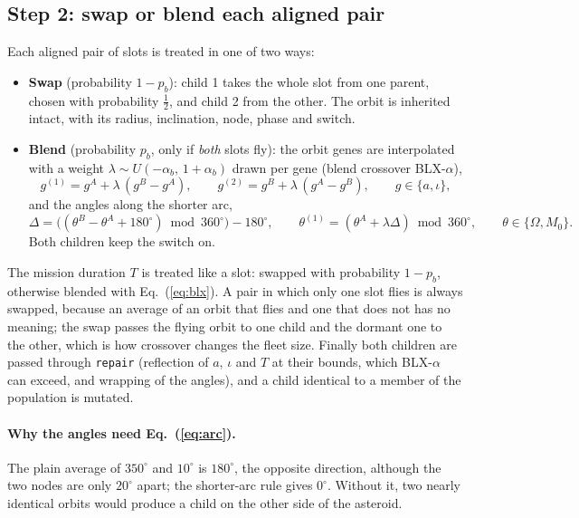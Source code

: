 \subsection{Step 2: swap or blend each aligned pair}
Each aligned pair of slots is treated in one of two ways:
\begin{itemize}
  \item \textbf{Swap} (probability $1-p_b$): child 1 takes the whole slot from one parent, chosen
        with probability $\tfrac12$, and child 2 from the other. The orbit is inherited intact,
        with its radius, inclination, node, phase and switch.
  \item \textbf{Blend} (probability $p_b$, only if \emph{both} slots fly): the orbit genes are
        interpolated with a weight $\lambda\sim U(-\alpha_b,\,1+\alpha_b)$ drawn per gene
        (blend crossover BLX-$\alpha$),
        \begin{equation}
        g^{(1)}=g^A+\lambda\,(g^B-g^A),\qquad g^{(2)}=g^B+\lambda\,(g^A-g^B),
        \qquad g\in\{a,\iota\},
        \label{eq:blx}
        \end{equation}
        and the angles along the shorter arc,
        \begin{equation}
        \Delta=\bigl((\theta^B-\theta^A+180^\circ)\bmod360^\circ\bigr)-180^\circ,\qquad
        \theta^{(1)}=(\theta^A+\lambda\Delta)\bmod360^\circ,\qquad \theta\in\{\Omega,M_0\}.
        \label{eq:arc}
        \end{equation}
        Both children keep the switch on.
\end{itemize}
The mission duration $T$ is treated like a slot: swapped with probability $1-p_b$, otherwise
blended with Eq.~(\ref{eq:blx}). A pair in which only one slot flies is always swapped, because an
average of an orbit that flies and one that does not has no meaning; the swap passes the flying
orbit to one child and the dormant one to the other, which is how crossover changes the fleet size.
Finally both children are passed through \texttt{repair} (reflection of $a$, $\iota$ and $T$ at
their bounds, which BLX-$\alpha$ can exceed, and wrapping of the angles), and a child identical to a
member of the population is mutated.

\paragraph{Why the angles need Eq.~(\ref{eq:arc}).} The plain average of $350^\circ$ and $10^\circ$
is $180^\circ$, the opposite direction, although the two nodes are only $20^\circ$ apart; the
shorter-arc rule gives $0^\circ$. Without it, two nearly identical orbits would produce a child on
the other side of the asteroid.


